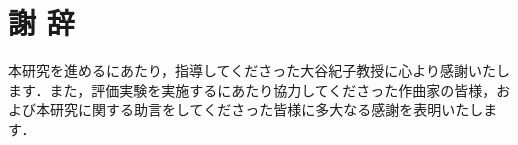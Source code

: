 \chapter*{謝 辞}
本研究を進めるにあたり，指導してくださった大谷紀子教授に心より感謝いたします．また，評価実験を実施するにあたり協力してくださった作曲家の皆様，および本研究に関する助言をしてくださった皆様に多大なる感謝を表明いたします．
